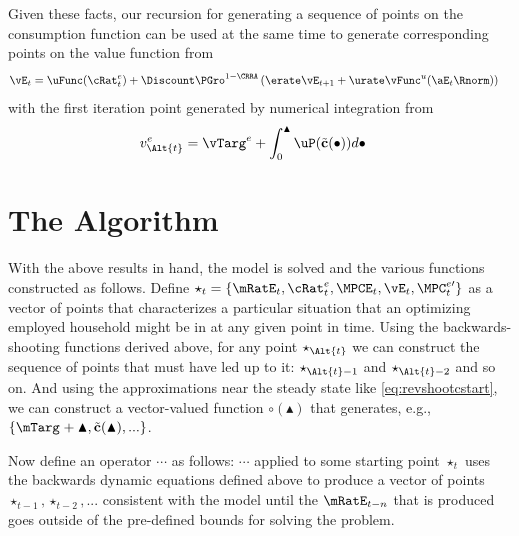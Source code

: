 \documentclass{handout}
\begin{document}
Given these facts, our recursion for generating a sequence of points on the consumption
function can be used at the same time to generate corresponding points on the value function from
\begin{equation}\begin{gathered}\begin{aligned}
  \vE_{t} & =  \uFunc({\cRat}^{e}_{t})+\Discount \PGro^{1-\CRRA} \left(\erate \vE_{t+1} + \urate \vFunc^{u}(\aE_{t} \Rnorm)\right)
\end{aligned}\end{gathered}\end{equation}
with the first iteration point generated by numerical integration from 
\begin{equation}\begin{gathered}\begin{aligned}
  v^{e}_{\Alt{t}} & =  \vTarg^{e}+\int_{0}^{\blacktriangle} \uP(\tilde{\mathbf{c}}(\bullet)) d\bullet
\end{aligned}\end{gathered}\end{equation}



\section{The Algorithm}

With the above results in hand, the model is solved and the various
functions constructed as follows.  Define $\star_{t} =
\{\mRatE_{t},{\cRat}^{e}_{t},\MPCE_{t},\vE_{t},\MPC_{t}^{e\prime}\}$ as a vector of points that
characterizes a particular situation that an optimizing employed
household might be in at any given point in time.  Using the backwards-shooting 
functions derived above, for any point $\star_{\Alt{t}}$ we can construct the
sequence of points that must have led up to it: $\star_{\Alt{t}-1}$ and
$\star_{\Alt{t}-2}$ and so on.  And using the approximations near the
steady state like \eqref{eq:revshootcstart}, we can construct 
a vector-valued function $\pmb{\circ}(\blacktriangle)$ that generates, 
e.g., $\{\mTarg^{\null}+\blacktriangle,\tilde{\mathbf{c}}(\blacktriangle), ... \}$.


Now define an operator $\cdots$ as follows: $\cdots$ applied to some
starting point $\star_{t}$ uses the backwards dynamic equations
defined above to produce a vector of points
$\star_{t-1},\star_{t-2},...$ consistent with the model until the
$\mRatE_{t-n}$ that is produced goes outside of the pre-defined bounds
for solving the problem.
\end{document}

